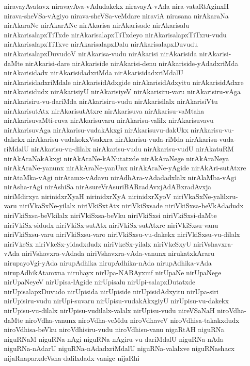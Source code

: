 {niravayAvatavx
niravayAva-vAdudakekx
niravayA-vAda
nira-vataRtAginxH
nirava-sheVSa-vAgiyo
nirava-sheVSa-veMdare
niraviA
nirasana
nirAkaraNa
nirAkaraNe
nirAkarANe
nirAkarisa
nirAkarisade
nirAkarisalu
nirAkarisalapxTiTxde
nirAkarisalapxTiTxdeyo
nirAkarisalapxTiTxru-vudu
nirAkarisalapxTiTxve
nirAkarisalapxDalu
nirAkarisalapxDuvudu
nirAkarisalapxDuvudoV
nirAkarisa-vudu
nirAkarisi
nirAkarisida
nirAkarisi-daMte
nirAkarisi-dare
nirAkariside
nirAkarisi-denu
nirAkariside-yAdadxriMda
nirAkarisidadx
nirAkarisidadxriMda
nirAkarisidadxriMdalU
nirAkarisidadxriMdale
nirAkarisidAdxgide
nirAkarisidAdxyitu
nirAkarisidAdxre
nirAkarisidudx
nirAkarisiyU
nirAkarisiyeV
nirAkarisiru-varu
nirAkarisiru-vAga
nirAkarisiru-vu-dariMda
nirAkarisiru-vudu
nirAkarisilalx
nirAkarisiVtu
nirAkarisutAtx
nirAkarisutAtxre
nirAkarisuva
nirAkarisu-vaMtaha
nirAkarisuvaMti-ruva
nirAkarisuvaru
nirAkarisu-valilx
nirAkarisuvavu
nirAkarisuvAga
nirAkarisu-vudakAkxgi
nirAkarisuvu-dakUkx
nirAkarisu-vu-dakekx
nirAkarisu-vudakokxVsakxra
nirAkarisu-vuda-riMda
nirAkarisu-vuda-riMdalU
nirAkarisu-vu-dilalx
nirAkarisu-vudu
nirAkarisu-vudU
nirAkatuRM
nirAkAraNakAkxgi
nirAkAraNe-kANutatxde
nirAkAraNege
nirAkAraNeya
nirAkAraNe-yanunx
nirAkAraNe-yanUnx
nirAkAraNe-yAgide
nirAkAri-sutAtxre
nirAtaMka-vAgi
nirAtamx-vAdavu
nirAdhAra-vAdadadxlalx
nirAlaMba-vAgi
nirAsha-rAgi
nirAshiSa
nirAsureVrAsuriBARradAvxjAdABxradAvxja
niriMdirxya
nirinidxrXyaH
nirinidxrXyA
nirinidxrXyoV
niriVkaSxNe-yalilxru-varu
niriVkaSxNe-yilalx
niriVkiSxtAtx
niriVkiSxsade
niriVkiSxsa-beVkAdadudx
niriVkiSxsa-beVkilalx
niriVkiSxsa-beVku
niriVkiSxsi
niriVkiSxsi-daMte
niriVkiSx-sidudx
niriVkiSx-sutAtx
niriVkiSx-sutAtxre
niriVkiSxsu-vanu
niriVkiSxsu-varu
niriVkiSxsu-varo
niriVkiSxsu-vu-dakekx
niriVkiSxsu-vu-dilalx
niriVkeSx
niriVkeSx-yidadxdudx
niriVkeSx-yilalx
niriVkeSxyU
niriVshavxra-vAda
niriVshavxra-vAdada
niriVshavxra-vAda-vanunx
nirukatxkAraru
nirupayoVgi-yAda
nirupAdhika
nirupAdhika-nAda
nirupAdhika-vAda
nirupAdhikAtamxna
niruhayx
nirUpa-NABAyxmf
nirUpaNe
nirUpaNege
nirUpaNeyeV
nirUpisa-lAgide
nirUpisalu
nirUpi-salapxDutatxde
nirUpisalapxDuvudo
nirUpisida
nirUpiside
nirUpisidAdxyitu
nirUpa-siri
nirUpisiru-vudu
nirUpi-suvaru
nirUpisu-vudakAkxgiyU
nirUpisu-vu-dakekx
nirUpisu-vu-dilalx
nirUpisu-vudilalx-valalx
nirUpisu-vudu
nireVSaNaH
niroVdha-daMte
niroVdha-vanunx
niroVdha-veMdu
niroVdhaveV
niroVdhisa-takakxdudx
niroVdhisa-beVku
niroVdhisiru-vudu
niroVdhisu-vanu
nigaRtAH
niguRNa
niguRNaM
niguRNa-nAgi
niguRNa-nAgiru-vu-dariMdalU
niguRNa-nAda
niguRNa-nAdarU
niguRNa-nAdadxriMdalU
niguRNa-valalxve
niguRNashacx
nijaRnaparxdeVsha-dalilxdadx-vanige
nijaRhi
}
